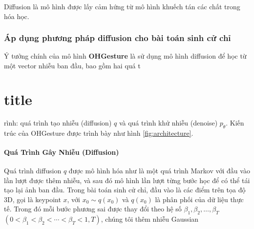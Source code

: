 
Diffusion \cite{ho2020denoising} là mô hình được lấy cảm hứng từ mô hình khuếch tán các chất trong hóa học.

\section{Áp dụng phương pháp diffusion cho bài toán sinh cử chỉ}

Ý tưởng chính của mô hình \textbf{OHGesture} là sử dụng mô hình diffusion \cite{ho2020denoising} để học từ một vector nhiễu ban đầu, bao gồm hai quá t\part{title}rình: quá trình tạo nhiễu (diffusion) $q$ và quá trình khử nhiễu (denoise) $p_{\theta}$. Kiến trúc của OHGesture được trình bày như hình \autoref{fig:architecture}. 



\subsection{Quá Trình Gây Nhiễu (Diffusion)}

Quá trình diffusion $q$ được mô hình hóa như là một quá trình Markov với đầu vào lần lượt được thêm nhiễu, và sau đó mô hình lần lượt từng bước học để có thể tái tạo lại ảnh ban đầu.
Trong bài toán sinh cử chỉ, đầu vào là các điểm trên tọa độ 3D, gọi là keypoint $x$, với $x_{0} \sim q\left(x_{0}\right)$ và $q\left(x_{0}\right)$ là phân phối của dữ liệu thực tế.
Trong đó mỗi bước phương sai được thay đổi theo hệ số $\beta_{1}, \beta_{2}, \ldots, \beta_{T}$ $\left(0<\beta_{1}<\beta_{2}<\cdots<\beta_{T}<1, T\right)$, chúng tôi thêm nhiễu Gaussian

